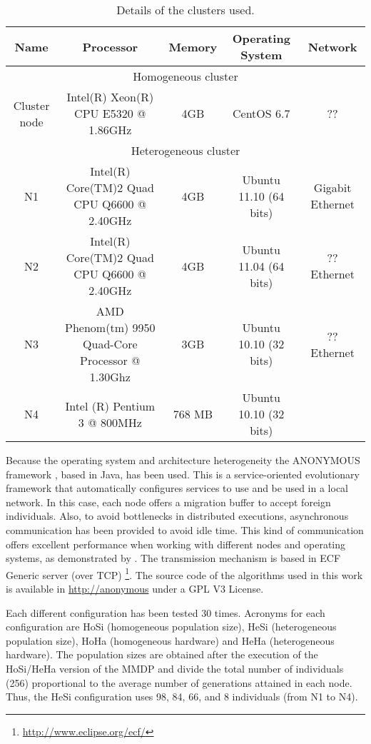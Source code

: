 \documentclass{sig-alternate}
\begin{document}
\begin{table*}
\centering
\caption{Details of the clusters used.}
\begin{tabular}{|c|c|c|c|c|} \hline
Name 		 & Processor 	& Memory 	& Operating System  & Network  \\ \hline
\multicolumn{5}{|c|}{Homogeneous cluster} \\ \hline
Cluster node &	Intel(R) Xeon(R) CPU   E5320  @ 1.86GHz		    &	4GB	& CentOS 6.7		& 	??  	\\ \hline
\hline
\multicolumn{5}{|c|}{Heterogeneous cluster} \\ \hline
N1	&	 Intel(R) Core(TM)2 Quad CPU    Q6600  @ 2.40GHz		& 4GB		&	Ubuntu 11.10 (64 bits)	&	Gigabit Ethernet	  	\\ \hline
N2 	&	 Intel(R) Core(TM)2 Quad CPU    Q6600  @ 2.40GHz		& 4GB		&	Ubuntu 11.04 (64 bits)	&	?? Ethernet	  	\\ \hline
N3 	&	 AMD Phenom(tm) 9950 Quad-Core Processor @ 1.30Ghz		& 3GB		&	Ubuntu 10.10 (32 bits)	&	?? Ethernet	  	\\ \hline
N4 	&	 Intel (R) Pentium 3 @ 800MHz		    				& 768 MB	&	Ubuntu 10.10 (32 bits)	& 		  	\\ \hline
\end{tabular}
\label{tab:computers}
\end{table*}

Because the operating system and architecture heterogeneity the ANONYMOUS framework \cite{OSGILIATH}, based in Java, has been used. This is a service-oriented evolutionary framework that automatically configures services to use and be used in a local network. In this case, each node offers a migration buffer to accept foreign individuals. Also, to avoid bottlenecks in distributed executions, asynchronous communication has been provided to avoid idle time. This kind of communication offers excellent performance when working with different nodes and operating systems, as demonstrated by \cite{HETEROGENEOUSHARD}. The transmission mechanism is based in ECF Generic server (over TCP) \footnote{\url{http://www.eclipse.org/ecf/}}. The source code of the algorithms used in this work is available in \url{http://anonymous} under a GPL V3 License.

Each different configuration has been tested 30 times. Acronyms for each configuration are HoSi (homogeneous population size), HeSi (heterogeneous population size), HoHa (homogeneous hardware) and HeHa (heterogeneous hardware). The population sizes are obtained after the execution of the HoSi/HeHa version of the MMDP and divide the total number of individuals (256) proportional to the average number of generations attained in each node. Thus, the HeSi configuration uses 98, 84, 66, and 8 individuals (from N1 to N4).
\end{document}
